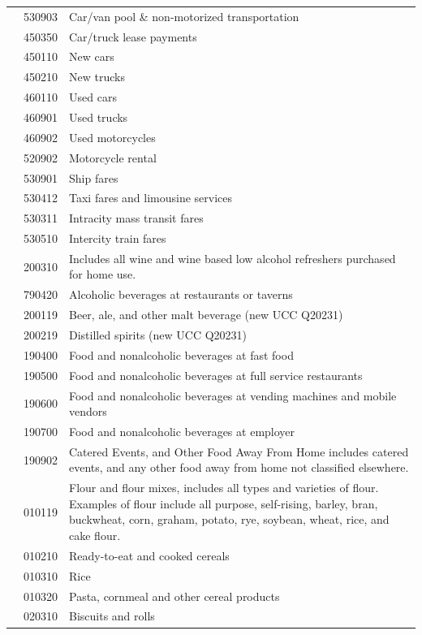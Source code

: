 \documentclass[
]{agujournal2019}
\begin{document}
\begin{table}
{\begin{tabular*}{\linewidth}{@{\extracolsep{\fill}}l|rl}
 & 530903 & Car/van pool \& non-motorized transportation \\ 
 & 450350 & Car/truck lease payments \\ 
 & 450110 & New cars \\ 
 & 450210 & New trucks \\ 
 & 460110 & Used cars \\ 
 & 460901 & Used trucks \\ 
 & 460902 & Used motorcycles \\ 
 & 520902 & Motorcycle rental \\ 
 & 530901 & Ship fares \\ 
 & 530412 & Taxi fares and limousine services \\ 
 & 530311 & Intracity mass transit fares \\ 
 & 530510 & Intercity train fares \\ 
\midrule\addlinespace[2.5pt]
\multirow[t]{81}{*}{Food} & 200310 & Includes all wine and wine based low alcohol refreshers purchased for home use. \\ 
 & 790420 & Alcoholic beverages at restaurants or taverns \\ 
 & 200119 & Beer, ale, and other malt beverage (new UCC Q20231) \\ 
 & 200219 & Distilled spirits (new UCC Q20231) \\ 
 & 190400 & Food and nonalcoholic beverages at fast food \\ 
 & 190500 & Food and nonalcoholic beverages at full service restaurants \\ 
 & 190600 & Food and nonalcoholic beverages at vending machines and mobile vendors \\ 
 & 190700 & Food and nonalcoholic beverages at employer \\ 
 & 190902 & Catered Events, and Other Food Away From Home includes catered events, and any other food away from home not classified elsewhere. \\ 
 & 010119 & Flour and flour mixes, includes all types and varieties of flour. Examples of flour include all purpose, self-rising, barley, bran, buckwheat, corn, graham, potato, rye, soybean, wheat, rice, and cake flour. \\ 
 & 010210 & Ready-to-eat and cooked cereals \\ 
 & 010310 & Rice \\ 
 & 010320 & Pasta, cornmeal and other cereal products \\ 
 & 020310 & Biscuits and rolls \\ 

\end{tabular*}}
\end{table}
\end{document}

